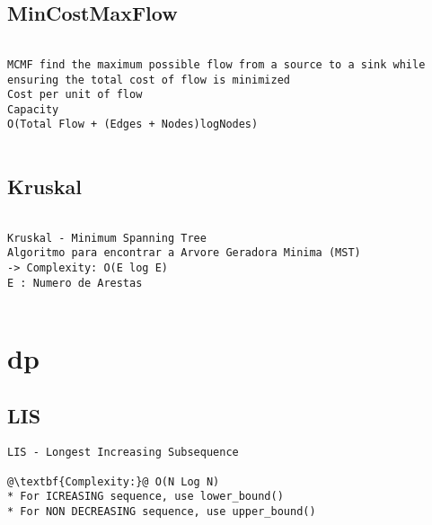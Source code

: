 \vspace{-2pt}
\subsection{MinCostMaxFlow}
\vspace{-4pt}
\begin{lstlisting}[style=description]

MCMF find the maximum possible flow from a source to a sink while ensuring the total cost of flow is minimized
Cost per unit of flow
Capacity 
O(Total Flow + (Edges + Nodes)logNodes)


\end{lstlisting}
\vspace{-5pt}
\raggedbottom
\hrulefill

\vspace{-2pt}
\subsection{Kruskal}
\vspace{-4pt}
\begin{lstlisting}[style=description]

Kruskal - Minimum Spanning Tree
Algoritmo para encontrar a Arvore Geradora Minima (MST)
-> Complexity: O(E log E) 
E : Numero de Arestas


\end{lstlisting}
\vspace{-5pt}
\raggedbottom
\hrulefill


\section{dp}
\vspace{-2pt}
\subsection{LIS}
\vspace{-4pt}
\begin{lstlisting}[style=description]
LIS - Longest Increasing Subsequence

@\textbf{Complexity:}@ O(N Log N)
* For ICREASING sequence, use lower_bound()
* For NON DECREASING sequence, use upper_bound()

\end{lstlisting}
\vspace{-5pt}
\raggedbottom
\hrulefill

